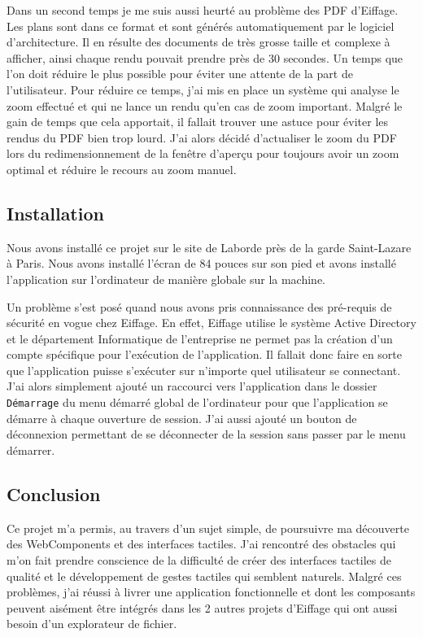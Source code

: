 Dans un second temps je me suis aussi heurté au problème des PDF d'Eiffage.
Les plans sont dans ce format et sont générés automatiquement par le logiciel d'architecture.
Il en résulte des documents de très grosse taille et complexe à afficher, ainsi chaque rendu pouvait prendre près de 30 secondes.
Un temps que l'on doit réduire le plus possible pour éviter une attente de la part de l'utilisateur.
Pour réduire ce temps, j'ai mis en place un système qui analyse le zoom effectué et qui ne lance un rendu qu'en cas de zoom important.
Malgré le gain de temps que cela apportait, il fallait trouver une astuce pour éviter les rendus du PDF bien trop lourd.
J'ai alors décidé d'actualiser le zoom du PDF lors du redimensionnement de la fenêtre d'aperçu pour toujours avoir un zoom optimal et réduire le recours au zoom manuel.

\subsection{Installation}

Nous avons installé ce projet sur le site de Laborde près de la garde Saint-Lazare à Paris.
Nous avons installé l'écran de 84 pouces sur son pied et avons installé l'application sur l'ordinateur de manière globale sur la machine.

Un problème s'est posé quand nous avons pris connaissance des pré-requis de sécurité en vogue chez Eiffage.
En effet, Eiffage utilise le système Active Directory et le département Informatique de l'entreprise ne permet pas la création d'un compte spécifique pour l'exécution de l'application.
Il fallait donc faire en sorte que l'application puisse s'exécuter sur n'importe quel utilisateur se connectant.
J'ai alors simplement ajouté un raccourci vers l'application dans le dossier \texttt{Démarrage} du menu démarré global de l'ordinateur pour que l'application se démarre à chaque ouverture de session.
J'ai aussi ajouté un bouton de déconnexion permettant de se déconnecter de la session sans passer par le menu démarrer.

\subsection{Conclusion}

Ce projet m'a permis, au travers d'un sujet simple, de poursuivre ma découverte des WebComponents et des interfaces tactiles.
J'ai rencontré des obstacles qui m'on fait prendre conscience de la difficulté de créer des interfaces tactiles de qualité et le développement de gestes tactiles qui semblent naturels.
Malgré ces problèmes, j'ai réussi à livrer une application fonctionnelle et dont les composants peuvent aisément être intégrés dans les 2 autres projets d'Eiffage qui ont aussi besoin d'un explorateur de fichier.
